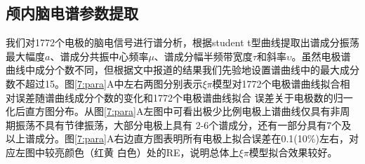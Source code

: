 \subsection{颅内脑电谱参数提取}
我们对1772个电极的脑电信号进行谱分析，根据student t型曲线提取出谱成分振荡最大幅度$a$、谱成分共振中心频率$\mu$、谱成分幅半频带宽度$
\tau$和斜率$\upsilon$。虽然电极谱曲线中成分个数不同，但根据\cite{frauscher2018atlas}文中报道的结果我们先验地设置谱曲线中的最大成分
数不超过15。图\ref{7:para}A中左右两图分别表示$\xi\pi$模型对1772个电极谱曲线拟合相对误差随谱曲线成分个数的变化和1772个电极谱曲线拟合
误差关于电极数的归一化后直方图分布。从图\ref{7:para}A左图中可看出极少比例电极上谱曲线仅具有非周期振荡不具有节律振荡，大部分电极上具有
2-6个谱成分，还有一部分具有7个及以上谱成分。图\ref{7:para}A右边直方图表明所有电极上拟合误差在0.1(10\%)左右，对应左图中较亮颜色（红黄
白色）处的RE，说明总体上$\xi\pi$模型拟合效果较好。

